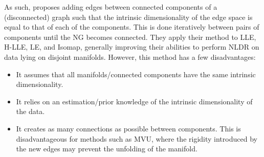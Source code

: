     As such, \cite{inspiration} proposes adding edges between connected components of a (disconnected) graph such that the intrinsic dimensionality of the edge space is equal to that of each of the components. This is done iteratively between pairs of components until the NG becomes connected. They apply their method to LLE, H-LLE, LE, and Isomap, generally improving their abilities to perform NLDR on data lying on disjoint manifolds. However, this method has a few disadvantages:
    \begin{itemize}
        \item It assumes that all manifolds/connected components have the same intrinsic dimensionality.
        \item It relies on an estimation/prior knowledge of the intrinsic dimensionality of the data.
        \item It creates as many connections as possible between components. This is disadvantageous for methods such as MVU, where the rigidity introduced by the new edges may prevent the unfolding of the manifold.
    \end{itemize}


    
    

    
